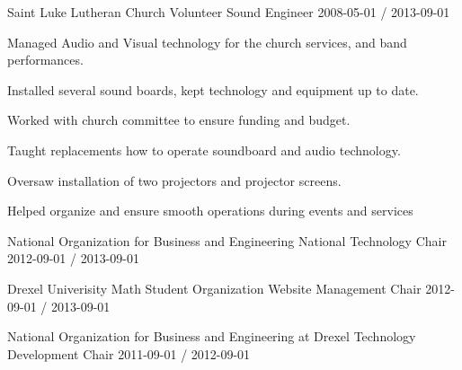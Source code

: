 \begin{cventries}
 
  \cventry
    {Saint Luke Lutheran Church}
    {Volunteer Sound Engineer}
    {}
    {2008-05-01 / 2013-09-01}
    {
          \begin{cvitems}
                \item{Managed Audio and Visual technology for the church services, and band performances.}
                \item{Installed several sound boards, kept technology and equipment up to date.}
                \item{Worked with church committee to ensure funding and budget.}
                \item{Taught replacements how to operate soundboard and audio technology.}
                \item{Oversaw installation of two projectors and projector screens.}
                \item{Helped organize and ensure smooth operations during events and services}
          \end{cvitems}
    }
 
  \cventry
    {National Organization for Business and Engineering}
    {National Technology Chair}
    {}
    {2012-09-01 / 2013-09-01}
    {
    }
 
  \cventry
    {Drexel Univerisity Math Student Organization}
    {Website Management Chair}
    {}
    {2012-09-01 / 2013-09-01}
    {
    }
 
  \cventry
    {National Organization for Business and Engineering at Drexel}
    {Technology Development Chair}
    {}
    {2011-09-01 / 2012-09-01}
    {
    }
 
\end{cventries}
